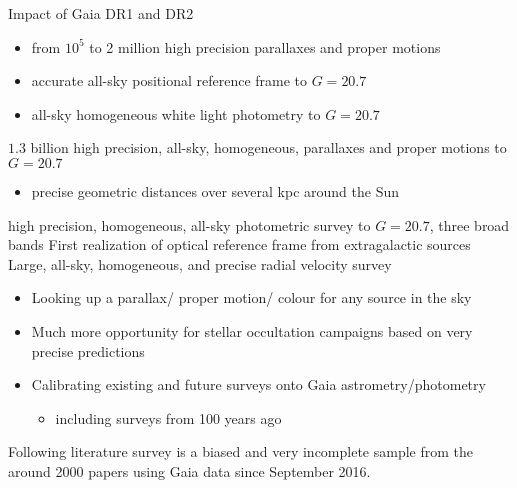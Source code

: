 \documentclass[smaller, aspectratio=169]{beamer}
\begin{document}
\begin{agaframe}{Impact of Gaia DR1 and DR2}
  \begin{itemize}
    \item from $10^5$ to 2 million high precision parallaxes and proper motions
    \item accurate all-sky positional reference frame to $G=20.7$
    \item all-sky homogeneous white light photometry to $G=20.7$
  \end{itemize}

  \medskip
  \begin{itemize}
    \itemd $1.3$ billion high precision, all-sky, homogeneous, parallaxes and proper motions to
      $G=20.7$
      \begin{itemize}
        \item precise geometric distances over several kpc around the Sun
      \end{itemize}
    \itemd high precision, homogeneous, all-sky photometric survey to $G=20.7$, three broad bands
    \itemd First realization of optical reference frame from extragalactic sources
    \itemd Large, all-sky, homogeneous, and precise radial velocity survey
  \end{itemize}

  \medskip
  \begin{itemize}
    \item Looking up a parallax/ proper motion/ colour for any source in the sky
    \item Much more opportunity for stellar occultation campaigns based on very precise predictions
    \item Calibrating existing and future surveys onto Gaia astrometry/photometry
      \begin{itemize}
        \item including surveys from 100 years ago
      \end{itemize}
  \end{itemize}

  \medskip
  Following literature survey is a biased and very incomplete sample from the around 2000 papers
  using Gaia data since September 2016.
\end{agaframe}
%

%

%

\end{document}
